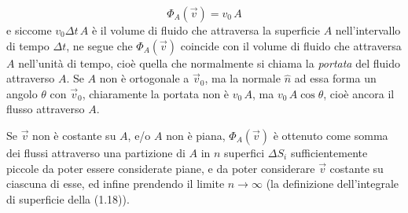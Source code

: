 \begin{equation}
\Phi_A(\vec v)=v_0\,A
\tag{1.19}
\end{equation}
e siccome $v_0\Delta t\,A$ è il volume di fluido che attraversa la superficie $A$ nell'intervallo di tempo $\Delta t$, ne segue che $\Phi_A(\vec v)$ coincide con il volume di fluido che attraversa $A$ nell'unità di tempo, cioè quella che normalmente si chiama la \emph{portata} del fluido attraverso $A$. Se $A$ non è ortogonale a $\vec v_0$, ma la normale $\hat n$ ad essa forma un angolo $\theta$ con $\vec v_0$, chiaramente la portata non è $v_0\,A$, ma $v_0\,A\cos\theta$, cioè ancora il flusso attraverso $A$.

Se $\vec v$ non è costante su $A$, e/o $A$ non è piana, $\Phi_A(\vec v)$ è ottenuto come somma dei flussi attraverso una partizione di $A$ in $n$ superfici $\Delta S_i$ sufficientemente piccole da poter essere considerate piane, e da poter considerare $\vec v$ costante su ciascuna di esse, ed infine prendendo il limite $n\to\infty$ \big(la definizione dell'integrale di superficie della (1.18)\big).

